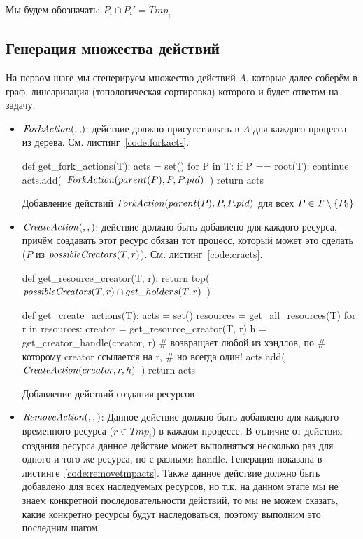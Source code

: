 Мы будем обозначать: $P_i \cap P_i' = Tmp_i$

\subsection{Генерация множества действий}

На первом шаге мы сгенерируем множество действий $A$, которые далее соберём в граф, линеаризация (топологическая сортировка) которого и будет ответом на задачу.

\begin{itemize}
	\item $\crfork{}{}$: действие должно присутствовать в $A$ для каждого процесса из дерева. См. листинг~\ref{code:forkacts}.

\begin{listing}[ht!]
\begin{pythoncode}
def get_fork_actions(T):
    acts = set()
    for P in T:
        if P == root(T):
            continue
        acts.add(~$\crfork{parent(P)}{P}{P.pid}$~)
    return acts
\end{pythoncode}
\caption{Добавление действий $\crfork{parent(P)}{P}{P.pid}$ для всех $P \in T \setminus \xbrace{P_0}$}
\label{code:forkacts}
\end{listing}

	\item $\text{\textit{CreateAction}}(, , )$: действие должно быть добавлено для каждого ресурса, причём создавать этот ресурс обязан тот процесс, который может это сделать ($P$ из $\text{\textit{possibleCreators}}(T, r)$). См. листинг~\ref{code:cracts}.

\begin{listing}[ht!]
\begin{pythoncode}
def get_resource_creator(T, r):
    return top(~$\possibleCreators{T}{r} \cap get\_holders(T, r)$~)

def get_create_actions(T):
    acts = set()
    resources = get_all_resources(T)
    for r in resources:
        creator = get_resource_creator(T, r)
        h = get_creator_handle(creator, r)  # возвращает любой из хэндлов, по
                                            # которому creator ссылается на r, 
                                            # но всегда один!
        acts.add(~$\crcreate{creator}{r}{h}$~)
    return acts
\end{pythoncode}
\caption{Добавление действий создания ресурсов}
\label{code:cracts}
\end{listing}


	\item $\text{\textit{RemoveAction}}(, , )$: Данное действие должно быть добавлено для каждого временного ресурса ($r \in Tmp_i$) в каждом процессе. В отличие от действия создания ресурса данное действие может выполняться несколько раз для одного и того же ресурса, но с разными handle. Генерация показана в листинге~\ref{code:removetmpacts}. Также данное действие должно быть добавлено для всех наследуемых ресурсов, но т.к. на данном этапе мы не знаем конкретной последовательности действий, то мы не можем сказать, какие конкретно ресурсы будут наследоваться, поэтому выполним это последним шагом.  


\end{itemize}
